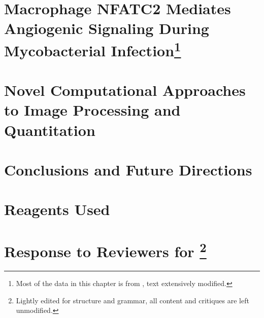 \documentclass[PhD]{dukethesis2006}
\begin{document}
\begin{doublespace}

\end{doublespace}

\chapter[Macrophage NFATC2 Mediates Angiogenic Signaling During Mycobacterial Infection]{Macrophage NFATC2 Mediates Angiogenic Signaling During Mycobacterial Infection\footnote{Most of the data in this chapter is from , text extensively modified.}}\label{chap3}

\begin{doublespace}

\end{doublespace}

\chapter{Novel Computational Approaches to Image Processing and Quantitation}\label{chap4}

\begin{doublespace}

\end{doublespace}

\chapter{Conclusions and Future Directions}\label{conclusions}

\begin{doublespace}

\end{doublespace}

\appendix

\chapter{Reagents Used}\label{reagents}

\begin{doublespace}

\end{doublespace}

\chapter[Response to Reviewers for \cite{Brewer2022}]{Response to Reviewers for \cite{Brewer2022}\footnote{Lightly edited for structure and grammar, all content and critiques are left unmodified.}}\label{r2r}
\end{document}
